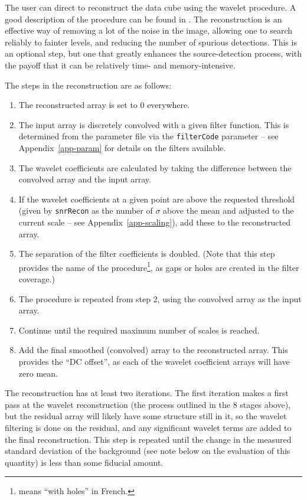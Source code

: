 \label{sec-recon}

The user can direct \duchamp to reconstruct the data cube using the
\atrous wavelet procedure. A good description of the procedure can be
found in \citet{starck02:book}. The reconstruction is an effective way
of removing a lot of the noise in the image, allowing one to search
reliably to fainter levels, and reducing the number of spurious
detections. This is an optional step, but one that greatly enhances
the source-detection process, with the payoff that it can be
relatively time- and memory-intensive.


The steps in the \atrous reconstruction are as follows:
\begin{enumerate}
\item The reconstructed array is set to 0 everywhere.
\item The input array is discretely convolved with a given filter
  function. This is determined from the parameter file via the
  \texttt{filterCode} parameter -- see Appendix~\ref{app-param} for
  details on the filters available.
\item The wavelet coefficients are calculated by taking the difference
  between the convolved array and the input array.
\item If the wavelet coefficients at a given point are above the
  requested threshold (given by \texttt{snrRecon} as the number of
  $\sigma$ above the mean and adjusted to the current scale -- see
  Appendix~\ref{app-scaling}), add these to the reconstructed array.
\item The separation of the filter coefficients is doubled. (Note that
  this step provides the name of the procedure\footnote{\atrous means
  ``with holes'' in French.}, as gaps or holes are created in the
  filter coverage.)
\item The procedure is repeated from step 2, using the convolved array
  as the input array.
\item Continue until the required maximum number of scales is reached.
\item Add the final smoothed (\ie convolved) array to the
  reconstructed array. This provides the ``DC offset'', as each of the
  wavelet coefficient arrays will have zero mean.
\end{enumerate}

The reconstruction has at least two iterations. The first iteration
makes a first pass at the wavelet reconstruction (the process outlined
in the 8 stages above), but the residual array will likely have some
structure still in it, so the wavelet filtering is done on the
residual, and any significant wavelet terms are added to the final
reconstruction. This step is repeated until the change in the measured
standard deviation of the background (see note below on the evaluation
of this quantity) is less than some fiducial amount.

